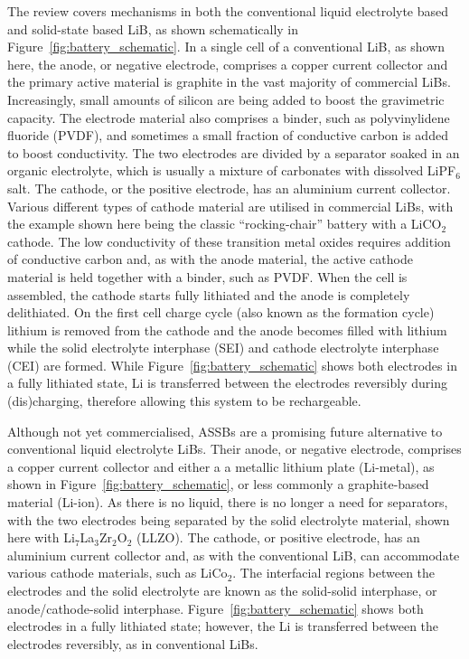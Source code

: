 \documentclass[../main.tex]{subfiles}
\begin{document}
The review covers mechanisms in both the conventional liquid electrolyte based and solid-state based LiB, as shown schematically in Figure~\ref{fig:battery_schematic}. In a single cell of a conventional LiB, as shown here, the anode, or negative electrode, comprises a copper current collector and the primary active material is graphite in the vast majority of commercial LiBs. Increasingly, small amounts of silicon are being added to boost the gravimetric capacity. The electrode material also comprises a binder, such as polyvinylidene fluoride (PVDF), and sometimes a small fraction of conductive carbon is added to boost conductivity. The two electrodes are divided by a separator soaked in an organic electrolyte, which is usually a mixture of carbonates with dissolved LiPF$_{6}$ salt. The cathode, or the positive electrode, has an aluminium current collector. Various different types of cathode material are utilised in commercial LiBs, with the example shown here being the classic ``rocking-chair'' battery with a LiCO$_{2}$ cathode.\cite{Scrosati_1992} The low conductivity of these transition metal oxides requires addition of conductive carbon and, as with the anode material, the active cathode material is held together with a binder, such as PVDF. When the cell is assembled, the cathode starts fully lithiated and the anode is completely delithiated. On the first cell charge cycle (also known as the formation cycle) lithium is removed from the cathode and the anode becomes filled with lithium while the solid electrolyte interphase (SEI) and cathode electrolyte interphase (CEI) are formed. While Figure~\ref{fig:battery_schematic} shows both electrodes in a fully lithiated state, Li is transferred between the electrodes reversibly during (dis)charging, therefore allowing this system to be rechargeable.

Although not yet commercialised, ASSBs are a promising future alternative to conventional liquid electrolyte LiBs. Their anode, or negative electrode, comprises a copper current collector and either a a metallic lithium plate (Li-metal), as shown in Figure~\ref{fig:battery_schematic}, or less commonly a graphite-based material (Li-ion). As there is no liquid, there is no longer a need for separators, with the two electrodes being separated by the solid electrolyte material, shown here with Li$_7$La$_3$Zr$_2$O$_2$ (LLZO). The cathode, or positive electrode, has an aluminium current collector and, as with the conventional LiB, can accommodate various cathode materials, such as LiCo$_2$. The interfacial regions between the electrodes and the solid electrolyte are known as the solid-solid interphase, or anode/cathode-solid interphase. Figure~\ref{fig:battery_schematic} shows both electrodes in a fully lithiated state; however, the Li is transferred between the electrodes reversibly, as in conventional LiBs.
\end{document}
